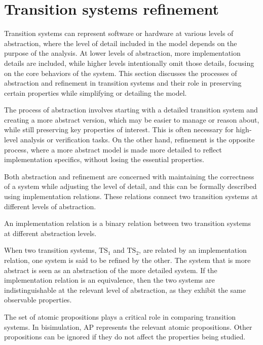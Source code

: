 \section{Transition systems refinement}

Transition systems can represent software or hardware at various levels of abstraction, where the level of detail included in the model depends on the purpose of the analysis. 
At lower levels of abstraction, more implementation details are included, while higher levels intentionally omit those details, focusing on the core behaviors of the system. 
This section discusses the processes of abstraction and refinement in transition systems and their role in preserving certain properties while simplifying or detailing the model.

The process of abstraction involves starting with a detailed transition system and creating a more abstract version, which may be easier to manage or reason about, while still preserving key properties of interest. 
This is often necessary for high-level analysis or verification tasks. On the other hand, refinement is the opposite process, where a more abstract model is made more detailed to reflect implementation specifics, without losing the essential properties.

Both abstraction and refinement are concerned with maintaining the correctness of a system while adjusting the level of detail, and this can be formally described using implementation relations.
These relations connect two transition systems at different levels of abstraction.
\begin{definition}
    An implementation relation is a binary relation between two transition systems at different abstraction levels.
\end{definition}
\noindent When two transition systems, $\text{TS}_1$ and $\text{TS}_2$, are related by an implementation relation, one system is said to be refined by the other. 
The system that is more abstract is seen as an abstraction of the more detailed system. 
If the implementation relation is an equivalence, then the two systems are indistinguishable at the relevant level of abstraction, as they exhibit the same observable properties.

The set of atomic propositions plays a critical role in comparing transition systems. 
In bisimulation, $\text{AP}$ represents the relevant atomic propositions. 
Other propositions can be ignored if they do not affect the properties being studied.

